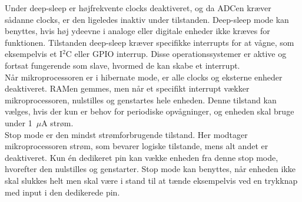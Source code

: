 Under deep-sleep er højfrekvente clocks deaktiveret, og da ADCen kræver sådanne clocks, er den ligeledes inaktiv under tilstanden. Deep-sleep mode kan benyttes, hvis høj ydeevne i analoge eller digitale enheder ikke kræves for funktionen. Tilstanden deep-sleep kræver specifikke interrupts for at vågne, som eksempelvis et I$^{2}$C eller GPIO interrup. Disse operationssystemer er aktive og fortsat fungerende som slave, hvormed de kan skabe et interrupt.~\citep{Semiconductor2016PowerMode} \\
Når mikroprocessoren er i hibernate mode, er alle clocks og eksterne enheder deaktiveret. RAMen gemmes, men når et specifikt interrupt vækker mikroprocessoren, nulstilles og genstartes hele enheden. Denne tilstand kan vælges, hvis der kun er behov for periodiske opvågninger, og enheden skal bruge under 1~$\mu$A strøm.~\citep{Semiconductor2016PowerMode} \\
Stop mode er den mindst strømforbrugende tilstand. Her modtager mikroprocessoren strøm, som bevarer logiske tilstande, mens alt andet er deaktiveret. Kun én dedikeret pin kan vække enheden fra denne stop mode, hvorefter den nulstilles og genstarter. Stop mode kan benyttes, når enheden ikke skal slukkes helt men skal være i stand til at tænde eksempelvis ved en trykknap med input i den dedikerede pin.~\citep{Semiconductor2016PowerMode}

